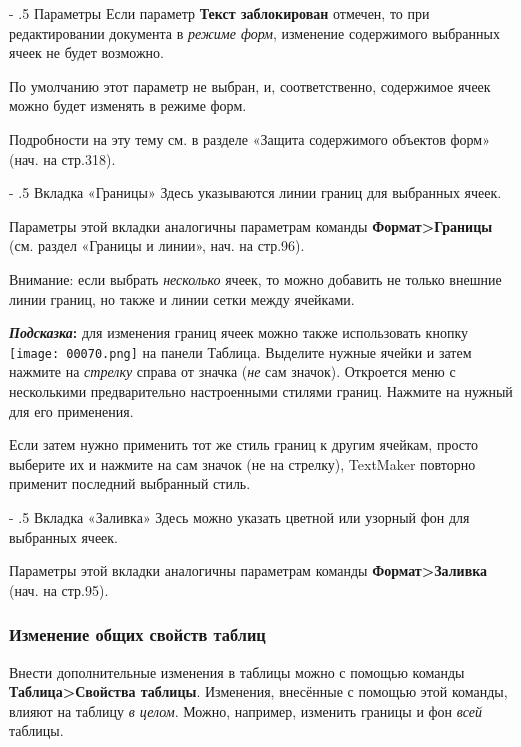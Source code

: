 \documentclass[a4paper,10pt]{article}
\makeatletter
\renewcommand\paragraph{%
   \@startsection{paragraph}{4}{0mm}%
      {-\baselineskip}%
      {.5\baselineskip}%
      {\normalfont\normalsize\bfseries}}
\makeatother
\begin{document}
\paragraph{Параметры}
Если параметр \textbf{Текст заблокирован} отмечен, то при редактировании документа в \textit{режиме форм}, изменение содержимого выбранных ячеек не будет возможно.

По умолчанию этот параметр не выбран, и, соответственно, содержимое ячеек можно будет изменять в режиме форм.

Подробности на эту тему см. в разделе «Защита содержимого объектов форм» (нач. на стр.318).

\paragraph{Вкладка «Границы»}
Здесь указываются линии границ для выбранных ячеек.

Параметры этой вкладки аналогичны параметрам команды \textbf{Формат>Границы} (см. раздел «Границы и линии», нач. на стр.96).

Внимание: если выбрать \textit{несколько} ячеек, то можно добавить не только внешние линии границ, но также и линии сетки между ячейками.

\begin{mdframed}[backgroundcolor=blue!10]
\textbf{\textit{Подсказка}:} для изменения границ ячеек можно также использовать кнопку \texttt{[image: 00070.png]} на панели Таблица. Выделите нужные ячейки и затем нажмите на \textit{стрелку} справа от значка (\textit{не} сам значок). Откроется меню с несколькими предварительно настроенными стилями границ. Нажмите на нужный для его применения.

Если затем нужно применить тот же стиль границ к другим ячейкам, просто выберите их и нажмите на сам значок (не на стрелку), TextMaker повторно применит последний выбранный стиль.
\end{mdframed}

\paragraph{Вкладка «Заливка»}
Здесь можно указать цветной или узорный фон для выбранных ячеек.

Параметры этой вкладки аналогичны параметрам команды \textbf{Формат>Заливка} (нач. на стр.95).

\subsubsection{Изменение общих свойств таблиц}
Внести дополнительные изменения в таблицы можно с помощью команды \textbf{Таблица>Свойства таблицы}. Изменения, внесённые с помощью этой команды, влияют на таблицу \textit{в целом}. Можно, например, изменить границы и фон \textit{всей} таблицы.
\end{document}
